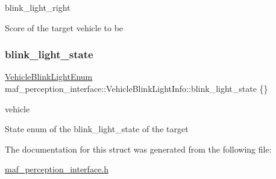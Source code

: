 blink\+\_\+light\+\_\+right 

Score of the target vehicle to be \mbox{\label{structmaf__perception__interface_1_1VehicleBlinkLightInfo_a4be6b0fb9f4e56097787ec79fb02ff72}} 
\subsubsection{\texorpdfstring{blink\+\_\+light\+\_\+state}{blink\_light\_state}}
{\footnotesize\ttfamily \hyperlink{structmaf__perception__interface_1_1VehicleBlinkLightEnum}{Vehicle\+Blink\+Light\+Enum} maf\+\_\+perception\+\_\+interface\+::\+Vehicle\+Blink\+Light\+Info\+::blink\+\_\+light\+\_\+state \{\}}



vehicle 

State enum of the blink\+\_\+light\+\_\+state of the target 

The documentation for this struct was generated from the following file\+:\begin{DoxyCompactItemize}
\item 
\hyperlink{maf__perception__interface_8h}{maf\+\_\+perception\+\_\+interface.\+h}\end{DoxyCompactItemize}
